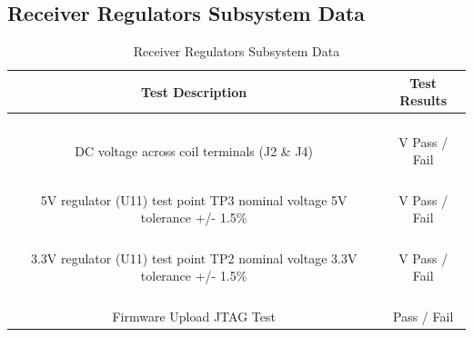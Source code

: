 \documentclass[12pt]{article}
\begin{document}
\begin{appendices}
\subsection{Receiver Regulators Subsystem Data}

\begin{table}[h!]
\centering
\caption*{Receiver Regulators Subsystem Data}
\begin{tabular}{ | c | c | }
\hline
\textbf{Test Description} & \textbf{Test Results} \\
\hline
\parbox{0.5\linewidth}{\raggedright \hfill \\[-0.25 em]
DC voltage across coil terminals (J2 \& J4)
 \hfill \\[0.1 em]} &  \parbox{0.4\linewidth}{\raggedright \hfill \\ [0.7 em]
\underline{\hspace{0.625in}} V  \hspace{0.125 in}Pass \space / \space  Fail \hfill \\ [0.3 em]
} \\
\hline
\parbox{0.5\linewidth}{\raggedright \hfill \\[-0.25 em]
5V regulator (U11) test point TP3 nominal voltage 5V  tolerance +/- 1.5\%
\hfill \\[0.1 em]} &  \parbox{0.4\linewidth}{\raggedright \hfill \\ [0.7 em]
\underline{\hspace{0.625in}} V  \hspace{0.125 in}Pass \space / \space  Fail \hfill \\ [0.3 em]
} \\
\hline
\parbox{0.5\linewidth}{\raggedright \hfill \\[-0.25 em]
3.3V regulator (U11) test point TP2 nominal voltage 3.3V  tolerance +/- 1.5\%
\hfill \\[0.1 em]} &  \parbox{0.4\linewidth}{\raggedright \hfill \\ [0.7 em]
\underline{\hspace{0.625in}} V  \hspace{0.125 in}Pass \space / \space  Fail \hfill \\ [0.3 em]
} \\ 
\hline
\parbox{0.5\linewidth}{\raggedright \hfill \\[-0.25 em]
Firmware Upload JTAG Test\hfill \\[0.1 em]
} &  \parbox{0.4\linewidth}{\centering \hfill \\ [0.7 em]
\hspace{0.125 in}Pass \space / \space  Fail \hfill \\ [0.3 em]
} \\ 
\hline
\end{tabular}
\end{table}
\hfill \\
\pagebreak


\end{appendices}
\end{document}
